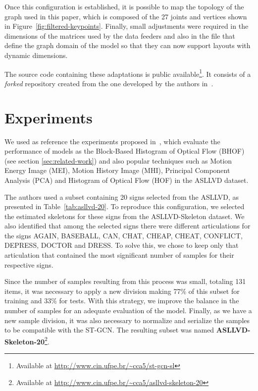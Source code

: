 Once this configuration is established, it is possible to map the topology of the graph used in this paper, which is composed of the 27 joints and vertices shown in  Figure~\ref{fig:filtered-keypoints}. Finally, small adjustments were required in the dimensions of the matrices used by the data feeders and also in the file
that define the graph domain of the model so that they can now support layouts with dynamic dimensions.

The source code containing these adaptations is public available\footnote{
    Available at \url{http://www.cin.ufpe.br/~cca5/st-gcn-sl}
}. It consists of a \textit{forked} repository created from the one developed by the authors in~\cite{st-gcn-2018}. %


\section{Experiments} 
\label{sec:experiments}

We used as reference the experiments proposed in~\cite{lim-2016}, which evaluate the performance of models as the Block-Based Histogram of Optical Flow (BHOF) (see section \ref{sec:related-work}) and also popular techniques such as Motion Energy Image (MEI), Motion History Image (MHI), Principal Component Analysis (PCA) and Histogram of Optical Flow (HOF) in the ASLLVD dataset.

The authors used a subset containing 20 signs selected from the ASLLVD, as presented in Table~\ref{tab:asllvd-20}. To reproduce this configuration, we selected the estimated skeletons for these signs from the ASLLVD-Skeleton dataset. 
We also identified that among the selected signs there were different articulations for the signs AGAIN, BASEBALL, CAN, CHAT, CHEAP, CHEAT, CONFLICT, DEPRESS, DOCTOR and DRESS. To solve this, we chose to keep only that articulation that contained the most significant number of samples for their respective signs.

Since the number of samples resulting from this process was small, totaling 131 items, it was necessary to apply a new division making 77\% of this subset for training and 33\% for tests. With this strategy, we improve the balance in the number of samples for an adequate evaluation of the model. Finally, as we have a new sample division, it was also necessary to normalize and serialize the samples to be compatible with the ST-GCN. 
The resulting subset was named \textbf{ASLLVD-Skeleton-20}\footnote{ Available at \url{http://www.cin.ufpe.br/~cca5/asllvd-skeleton-20} }. %


